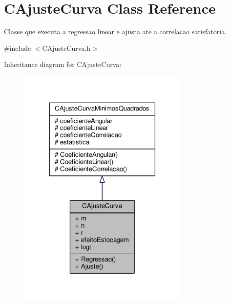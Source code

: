 \hypertarget{classCAjusteCurva}{\section{C\-Ajuste\-Curva Class Reference}
\label{classCAjusteCurva}
}


Classe que executa a regressao linear e ajusta ate a correlacao satisfatoria.  




{\ttfamily \#include $<$C\-Ajuste\-Curva.\-h$>$}



Inheritance diagram for C\-Ajuste\-Curva\-:
\nopagebreak
\begin{figure}[H]
\begin{center}
\leavevmode
\includegraphics[width=242pt]{classCAjusteCurva__inherit__graph}
\end{center}
\end{figure}


